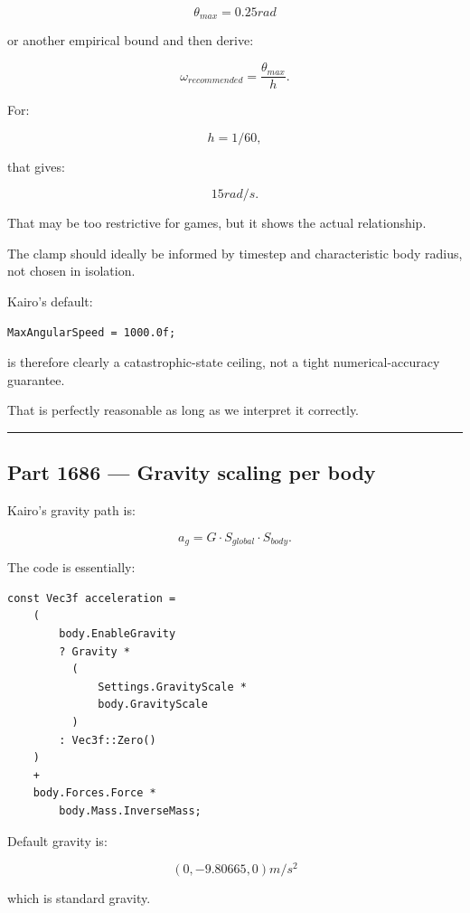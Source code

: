 \[
\theta_{max}=0.25rad
\]

or another empirical bound and then derive:

\[
\omega_{recommended}
=
\frac{\theta_{max}}{h}.
\]

For:

\[
h=1/60,
\]

that gives:

\[
15rad/s.
\]

That may be too restrictive for games, but it shows the actual relationship.

The clamp should ideally be informed by timestep and characteristic body radius, not chosen in isolation.

Kairo's default:

\begin{verbatim}
MaxAngularSpeed = 1000.0f;
\end{verbatim}

is therefore clearly a catastrophic-state ceiling, not a tight numerical-accuracy guarantee.

That is perfectly reasonable as long as we interpret it correctly.

\begin{center}\rule{0.5\linewidth}{0.5pt}\end{center}

\subsection{Part 1686 --- Gravity scaling per body}\label{06-engine-ii-ch038-part-1686-gravity-scaling-per-body}

\hypertarget{06-engine-ii-ch038-part-1686-gravity-scaling-per-body}{}

Kairo's gravity path is:

\[
\boxed{
a_g
=
G
\cdot
S_{global}
\cdot
S_{body}.
}
\]

The code is essentially:

\begin{verbatim}
const Vec3f acceleration =
    (
        body.EnableGravity
        ? Gravity *
          (
              Settings.GravityScale *
              body.GravityScale
          )
        : Vec3f::Zero()
    )
    +
    body.Forces.Force *
        body.Mass.InverseMass;
\end{verbatim}

Default gravity is:

\[
\boxed{
(0,-9.80665,0)m/s^2
}
\]

which is standard gravity.


